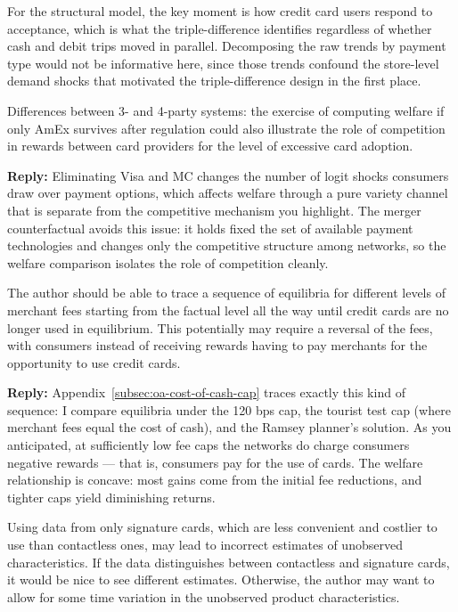\documentclass[main.tex]{subfiles}
\begin{document}
\begin{refsection}
For the structural model, the key moment is how credit card users respond to acceptance, which is what the triple-difference identifies regardless of whether cash and debit trips moved in parallel.
Decomposing the raw trends by payment type would not be informative here, since those trends confound the store-level demand shocks that motivated the triple-difference design in the first place.

\begin{refcommentnoclear}
Differences between 3- and 4-party systems: the exercise of computing welfare if only AmEx survives after regulation could also illustrate the role of competition in rewards between card providers for the level of excessive card adoption.
\end{refcommentnoclear}

\textbf{Reply:} Eliminating Visa and MC changes the number of logit shocks consumers draw over payment options, which affects welfare through a pure variety channel that is separate from the competitive mechanism you highlight.
The merger counterfactual avoids this issue: it holds fixed the set of available payment technologies and changes only the competitive structure among networks, so the welfare comparison isolates the role of competition cleanly.

\begin{refcommentnoclear}
The author should be able to trace a sequence of equilibria for different levels of merchant fees starting from the factual level all the way until credit cards are no longer used in equilibrium.
This potentially may require a reversal of the fees, with consumers instead of receiving rewards having to pay merchants for the opportunity to use credit cards.

\end{refcommentnoclear}

\textbf{Reply:} Appendix~\ref{subsec:oa-cost-of-cash-cap} traces exactly this kind of sequence: I compare equilibria under the 120 bps cap, the tourist test cap (where merchant fees equal the cost of cash), and the Ramsey planner's solution.
As you anticipated, at sufficiently low fee caps the networks do charge consumers negative rewards --- that is, consumers pay for the use of cards.
The welfare relationship is concave: most gains come from the initial fee reductions, and tighter caps yield diminishing returns.

\begin{refcommentnoclear}
Using data from only signature cards, which are less convenient and costlier to use than contactless ones, may lead to incorrect estimates of unobserved characteristics.
If the data distinguishes between contactless and signature cards, it would be nice to see different estimates.
Otherwise, the author may want to allow for some time variation in the unobserved product characteristics.


\end{refcommentnoclear}
\end{refsection}
\end{document}
